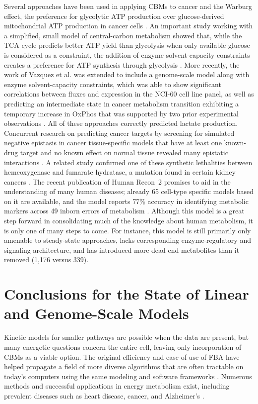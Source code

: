 \documentclass[phd,tocprelim,draft]{cornell}
\newcommand{\citep}[1]{\cite{#1}}
\begin{document}
Several approaches have been used in applying CBMs to cancer and the
Warburg effect, the preference for glycolytic ATP production over
glucose-derived mitochondrial ATP production in cancer cells 
\citep{Resendis-Antonio2010a, Shlomi2011, Vazquez2011}. An
important study working with a simplified, small model of
central-carbon metabolism showed that, while the TCA cycle predicts
better ATP yield than glycolysis when only available glucose is
considered as a constraint, the addition of enzyme solvent-capacity
constraints creates a preference for ATP synthesis through
glycolysis \citep{Vazquez2011}. More recently, the work of Vazquez et al. was extended
to include a genome-scale model along with enzyme solvent-capacity
constraints, which was able to show significant correlations between
fluxes and expression in the NCI-60 cell line panel, as well as
predicting an intermediate state in cancer metabolism transition
exhibiting a temporary increase in OxPhos that was supported by two
prior experimental observations \citep{Shlomi2011}. All of these
approaches correctly predicted lactate production. Concurrent research
on predicting cancer targets by screening for simulated negative
epistasis in cancer tissue-specific models that have at least one
known-drug target and no known effect on normal tissue revealed many
epistatic interactions \citep{Folger2011}. A related study confirmed
one of these synthetic lethalities between hemeoxygenase and fumarate
hydratase, a mutation found in certain kidney cancers
\citep{Frezza2011}. The recent publication of Human Recon~2 promises
to aid in the understanding of many human diseases; already 65
cell-type specific models based on it are available, and the model
reports 77\% accuracy in identifying metabolic markers across 49
inborn errors of metabolism \citep{Thiele2013}. Although this model is
a great step forward in consolidating much of the knowledge about human
metabolism, it is only one of many steps to come. For instance, this
model is still primarily only amenable to steady-state approaches,
lacks corresponding enzyme-regulatory and signaling architecture, and
has introduced more dead-end metabolites than it removed (1,176 versus
339). 

\section{Conclusions for the State of Linear and Genome-Scale Models}
Kinetic models for smaller pathways are possible when the data are
present, but many energetic questions concern the entire cell, leaving
only incorporation of CBMs as a viable option. The original efficiency
and ease of use of FBA have helped propagate a field of more diverse
algorithms that are often tractable on today’s computers using the
same modeling and software frameworks \citep{Gianchandani2009,
Lewis2012_sb2013}.  Numerous methods and successful applications in
energy metabolism exist, including prevalent diseases such as heart
disease, cancer, and Alzheimer’s \citep{Sangar2012}.
\end{document}
